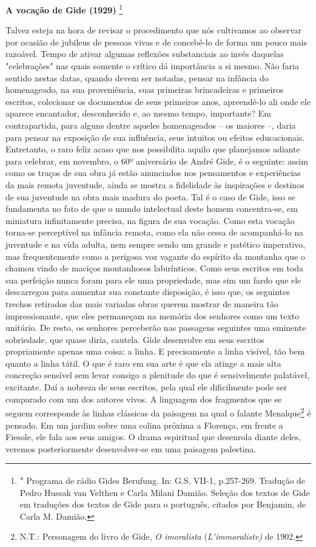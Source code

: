 \textbf{A vocação de Gide (1929)} \footnote{\textsuperscript{∗} Programa
  de rádio Gides Berufung. In: G.S. VII-1, p.257-269. Tradução de Pedro
  Hussak van Velthen e Carla Milani Damião. Seleção dos textos de Gide
  em traduções dos textos de Gide para o português, citados por
  Benjamin, de Carla M. Damião.}

Talvez esteja na hora de revisar o procedimento que nós cultivamos ao
observar por ocasião de jubileus de pessoas vivas e de concebê-lo de
forma um pouco mais razoável. Tempo de ativar algumas reflexões
substanciais ao invés daquelas "celebrações" nas quais somente o crítico
dá importância a si mesmo. Não faria sentido nestas datas, quando devem
ser notadas, pensar na infância do homenageado, na sua proveniência,
suas primeiras brincadeiras e primeiros escritos, colecionar os
documentos de seus primeiros anos, apreendê-lo ali onde ele aparece
encantador, desconhecido e, ao mesmo tempo, importante? Em
contrapartida, para alguns dentre aqueles homenageados -- os maiores --,
daria para pensar na exposição de sua influência, seus intuitos ou
efeitos educacionais. Entretanto, o raro feliz acaso que nos possibilita
aquilo que planejamos adiante para celebrar, em novembro, o 60º
aniversário de André Gide, é o seguinte: assim como os traços de sua
obra já estão anunciados nos pensamentos e experiências da mais remota
juventude, ainda se mostra a fidelidade às inspirações e destinos de sua
juventude na obra mais madura do poeta. Tal é o caso de Gide, isso se
fundamenta no fato de que o mundo intelectual deste homem concentra-se,
em miniatura infinitamente precisa, na figura de sua vocação. Como esta
vocação torna-se perceptível na infância remota, como ela não cessa de
acompanhá-lo na juventude e na vida adulta, nem sempre sendo um grande e
patético imperativo, mas frequentemente como a perigosa voz vagante do
espírito da montanha que o chamou vindo de maciços montanhosos
labirínticos. Como seus escritos em toda sua perfeição nunca foram para
ele uma propriedade, mas sim um fardo que ele descarregou para aumentar
sua constante disposição, é isso que, os seguintes trechos retirados das
mais variadas obras querem mostrar de maneira tão impressionante, que
eles permaneçam na memória dos senhores como um texto unitário. De
resto, os senhores perceberão nas passagens seguintes uma eminente
sobriedade, que quase diria, cautela. Gide desenvolve em seus escritos
propriamente apenas uma coisa: a linha. E precisamente a linha visível,
tão bem quanto a linha tátil. O que é raro em sua arte é que ela atinge
a mais alta concreção sensível sem levar consigo a plenitude do que é
sensivelmente palatável, excitante. Daí a nobreza de seus escritos, pela
qual ele dificilmente pode ser comparado com um dos autores vivos. A
linguagem dos fragmentos que se seguem corresponde às linhas clássicas
da paisagem na qual o falante Menalque\footnote{N.T.: Personagem do
  livro de Gide, \emph{O imoralista} (\emph{L'immoraliste)} de 1902.} é
pensado. Em um jardim sobre uma colina próxima a Florença, em frente a
Fiesole, ele fala aos seus amigos. O drama espiritual que desenrola
diante deles, veremos posteriormente desenvolver-se em uma paisagem
palestina.

